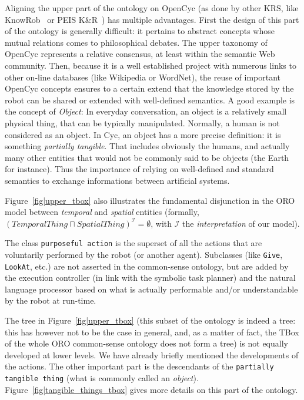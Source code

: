 \documentclass[preprint,3p,times]{elsarticle}
\newcommand{\concept}[1]{{\small \texttt{#1}}}
\begin{document}
Aligning the upper part of the ontology on {\sc OpenCyc} (as done by other
KRS, like {\sc KnowRob}~\cite{Tenorth2009a} or PEIS K\&R~\cite{Daoutis2009})
has multiple advantages. First the design of this part of the ontology is
generally difficult: it pertains to abstract concepts whose mutual relations
comes to philosophical debates. The upper taxonomy of {\sc OpenCyc} represents
a relative consensus, at least within the semantic Web community. Then, because
it is a well established project with numerous links to other on-line databases
(like Wikipedia or WordNet), the reuse of important {\sc OpenCyc} concepts
ensures to a certain extend that the knowledge stored by the robot can be
shared or extended with well-defined semantics. A good example is the concept
of \emph{Object}: In everyday conversation, an object is a relatively small
physical thing, that can be typically manipulated. Normally, a human is not
considered as an object. In {\sc Cyc}, an object has a more precise definition:
it is something \emph{partially tangible}. That includes obviously the humans,
and actually many other entities that would not be commonly said to be objects
(the Earth for instance). Thus the importance of relying on well-defined and
standard semantics to exchange informations between artificial systems.

Figure~\ref{fig|upper_tbox} also illustrates the fundamental disjunction
in the ORO model between \emph{temporal} and \emph{spatial} entities (formally,
$(TemporalThing \sqcap SpatialThing)^{\mathcal{I}} = \emptyset$, with
$\mathcal{I}$ the \emph{interpretation} of our model).

The class \concept{purposeful action} is the superset of all the actions that
are voluntarily performed by the robot (or another agent). Subclasses (like
\concept{Give}, \concept{LookAt}, etc.) are not asserted in the common-sense
ontology, but are added by the execution controller (in link with the symbolic
task planner) and the natural language processor based on what is actually
performable and/or understandable by the robot at run-time.

The tree in Figure~\ref{fig|upper_tbox} (this subset of the ontology is indeed
a tree: this has however not to be the case in general, and, as a matter of
fact, the TBox of the whole ORO common-sense ontology does not form a tree) is
not equally developed at lower levels. We have already briefly mentioned the
developments of the actions. The other important part is the descendants of the
\concept{partially tangible thing} (what is commonly called an \emph{object}).
Figure~\ref{fig|tangible_things_tbox} gives more details on this part of the
ontology.
\end{document}
